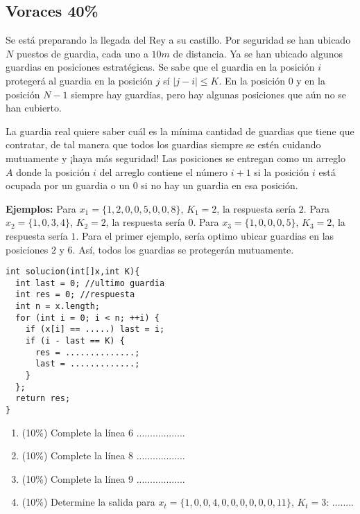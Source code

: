 \documentclass[10 pt]{article}
\begin{document}
\begin{multicols}{2}
\columnbreak
\section{Voraces 40\%}
Se está preparando la llegada del Rey a su castillo. Por seguridad se han ubicado $N$ puestos de guardia, cada uno a $10m$ de distancia. Ya se han ubicado algunos guardias en posiciones estratégicas. Se sabe que el guardia en la posición $i$ protegerá al guardia en la posición $j$ sí $| j - i| \leq K$. En la posición $0$ y en la posición $N-1$ siempre hay guardias, pero hay algunas posiciones que aún no se han cubierto. 

La guardia real quiere saber cuál es la mínima cantidad de guardias que tiene que contratar, de tal manera que todos los guardias siempre se estén cuidando mutuamente y ¡haya más seguridad! Las posiciones se entregan como un arreglo $A$ donde la posición $i$ del arreglo contiene el número $i + 1$ si la posición $i$ está ocupada por un guardia o un $0$ si no hay un guardia en esa posición.

\textbf{Ejemplos: } Para $x_1 = \{1,2,0,0,5,0,0,8\}$, $K_1 = 2$, la respuesta sería $2$. Para $x_2=\{1,0,3,4\}$, $K_2=2$, la respuesta sería $0$. Para $x_3=\{1,0,0,0,5\}$, $K_3=2$, la respuesta sería $1$. Para el primer ejemplo, sería optimo ubicar guardias en las posiciones $2$ y $6$. Así, todos los guardias se protegerán mutuamente. 

\begin{lstlisting}
int solucion(int[]x,int K){
  int last = 0; //ultimo guardia
  int res = 0; //respuesta
  int n = x.length;
  for (int i = 0; i < n; ++i) {
    if (x[i] == .....) last = i;
    if (i - last == K) {
      res = ..............;
      last = .............;
    }
  };
  return res;
}
\end{lstlisting}
%
\begin{enumerate}[label=(\alph*)]
    \item (10\%) Complete la línea 6 ..................
	\item (10\%) Complete la línea 8 ..................
	\item (10\%) Complete la línea 9 ..................
	\item (10\%) Determine la salida para $x_t = \{1,0,0,4,0,0,0,0,0,0,11\}$, $K_t=3$: ........
\end{enumerate}


\pagebreak

\end{multicols}
\end{document}
